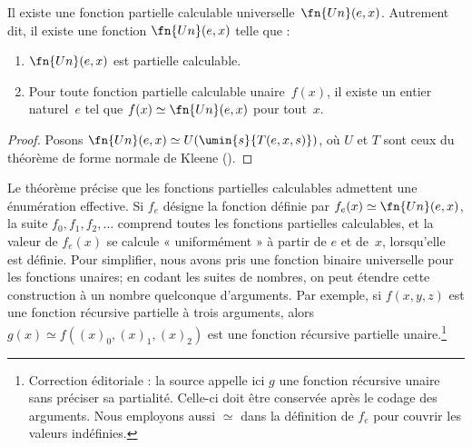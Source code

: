 \documentclass[../../../include/open-logic-section]{subfiles}
\begin{document}

\begin{thm}
Il existe une fonction partielle calculable
universelle~$\fn{Un}(e,x)$. Autrement dit,
il existe une fonction $\fn{Un}(e,x)$ telle que :
\begin{enumerate}
\item $\fn{Un}(e,x)$ est partielle calculable.
\item Pour toute fonction partielle calculable
  unaire~$f(x)$, il existe un entier naturel~$e$
  tel que $f(x) \simeq \fn{Un}(e,x)$ pour tout~$x$.
\end{enumerate}
\end{thm}

\begin{proof}
Posons $\fn{Un}(e,x) \simeq U(\umin{s}{T(e,x,s)})$,
où $U$ et $T$ sont ceux du théorème de forme
normale de Kleene
().
\end{proof}

\begin{explain}
Le théorème précise que les fonctions partielles
calculables admettent une énumération effective.
Si $f_e$ désigne la fonction définie par
$f_e(x) \simeq \fn{Un}(e,x)$, la suite
$f_0,f_1,f_2,\dots$ comprend toutes les fonctions
partielles calculables, et la valeur de $f_e(x)$
se calcule « uniformément » à partir de $e$
et de~$x$, lorsqu'elle est définie. Pour
simplifier, nous avons pris une fonction binaire
universelle pour les fonctions unaires; en codant
les suites de nombres, on peut étendre cette
construction à un nombre quelconque d'arguments.
Par exemple, si $f(x,y,z)$ est une fonction
récursive partielle à trois arguments, alors
$g(x) \simeq f((x)_0,(x)_1,(x)_2)$ est une
fonction récursive partielle unaire.\footnote{Correction éditoriale : la source appelle ici $g$ une fonction récursive unaire sans préciser sa partialité. Celle-ci doit être conservée après le codage des arguments. Nous employons aussi $\simeq$ dans la définition de $f_e$ pour couvrir les valeurs indéfinies.}
\end{explain}
\end{document}
